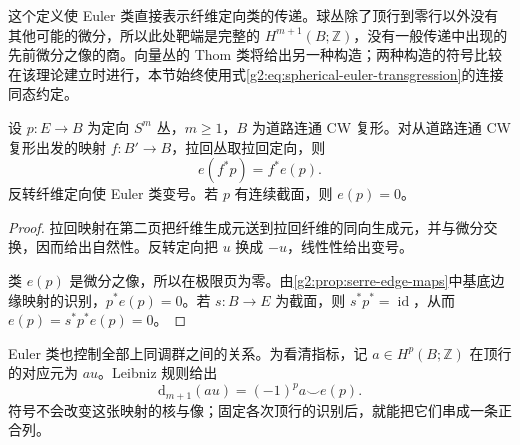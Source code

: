 这个定义使 Euler 类直接表示纤维定向类的传递。球丛除了顶行到零行以外没有其他可能的微分，所以此处靶端是完整的 \(H^{m+1}(B;\mathbb Z)\)，没有一般传递中出现的先前微分之像的商。向量丛的 Thom 类将给出另一种构造；两种构造的符号比较在该理论建立时进行，本节始终使用式\eqref{g2:eq:spherical-euler-transgression}的连接同态约定。

\begin{proposition}\label{g2:prop:spherical-euler-naturality}
	设 \(p:E\to B\) 为定向 \(S^m\) 丛，\(m\ge1\)，\(B\) 为道路连通 CW 复形。对从道路连通 CW 复形出发的映射 \(f:B'\to B\)，拉回丛取拉回定向，则
	\[
		e(f^*p)=f^*e(p).
	\]
	反转纤维定向使 Euler 类变号。若 \(p\) 有连续截面，则 \(e(p)=0\)。
\end{proposition}
\begin{proof}
	拉回映射在第二页把纤维生成元送到拉回纤维的同向生成元，并与微分交换，因而给出自然性。反转定向把 \(u\) 换成 \(-u\)，线性性给出变号。

	类 \(e(p)\) 是微分之像，所以在极限页为零。由\cref{g2:prop:serre-edge-maps}中基底边缘映射的识别，\(p^*e(p)=0\)。若 \(s:B\to E\) 为截面，则 \(s^*p^*=\operatorname{id}\)，从而 \(e(p)=s^*p^*e(p)=0\)。
\end{proof}

Euler 类也控制全部上同调群之间的关系。为看清指标，记 \(a\in H^p(B;\mathbb Z)\) 在顶行的对应元为 \(au\)。Leibniz 规则给出
\[
	\mathrm d_{m+1}(au)=(-1)^p a\smile e(p).
\]
符号不会改变这张映射的核与像；固定各次顶行的识别后，就能把它们串成一条正合列。

